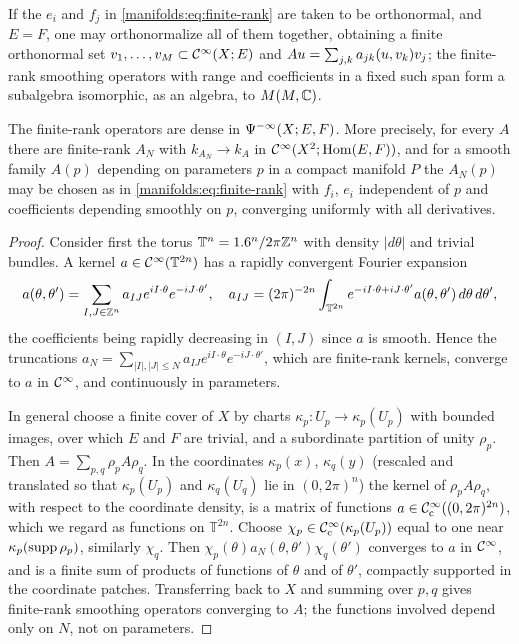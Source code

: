If the $e_i$ and $f_j$ in \eqref{manifolds:eq:finite-rank} are taken to be orthonormal,
and $E=F$, one may orthonormalize all of them together, obtaining a finite
orthonormal set $v_1,\dots,v_M\subset\mathcal{C}^\infty(X;E)$ and
$Au=\sum_{j,k}a_{jk}( u, v_k)v_j$; the finite-rank smoothing operators with range
and coefficients in a fixed such span form a subalgebra isomorphic, as an algebra,
to $M(M,\mathbb{C})$.

\begin{lemma}\label{manifolds:lem:density}
The finite-rank operators are dense in $\Psi^{-\infty}(X;E,F)$. More precisely,
for every $A$ there are finite-rank $A_N$ with $k_{A_N}\to k_A$ in $\mathcal{C}^\infty(X^2;\operatorname{Hom}(E,F))$,
and for a smooth family $A(p)$ depending on parameters $p$ in a compact manifold $P$
the $A_N(p)$ may be chosen as in \eqref{manifolds:eq:finite-rank} with $f_i$, $e_i$
independent of $p$ and coefficients depending smoothly on $p$, converging
uniformly with all derivatives.
\end{lemma}
\begin{proof}
Consider first the torus $\mathbb T^n=1.6^n/2\pi\mathbb{Z}^n$ with density $|d\theta|$ and trivial
bundles. A kernel $a\in\mathcal{C}^\infty(\mathbb T^{2n})$ has a rapidly convergent Fourier expansion
\begin{equation*}
a(\theta,\theta')=\sum_{I,J\in\mathbb{Z}^n}a_{IJ}e^{iI\cdot\theta}e^{-iJ\cdot\theta'},\quad
a_{IJ}=(2\pi)^{-2n}\int_{\mathbb T^{2n}}e^{-iI\cdot\theta+iJ\cdot\theta'}a(\theta,\theta')\,d\theta\,d\theta',
\end{equation*}
the coefficients being rapidly decreasing in $(I,J)$ since $a$ is smooth. Hence the
truncations $a_N=\sum_{|I|,|J|\le N}a_{IJ}e^{iI\cdot\theta}e^{-iJ\cdot\theta'}$, which are
finite-rank kernels, converge to $a$ in $\mathcal{C}^\infty$, and continuously in parameters.

In general choose a finite cover of $X$ by charts $\kappa_p:U_p\to\kappa_p(U_p)$ with
bounded images, over which $E$ and $F$ are trivial, and a subordinate partition of unity
$\rho_p$. Then $A=\sum_{p,q}\rho_pA\rho_q$. In the coordinates $\kappa_p(x)$, $\kappa_q(y)$
(rescaled and translated so that $\kappa_p(U_p)$ and $\kappa_q(U_q)$ lie in $(0,2\pi)^n$) the
kernel of $\rho_pA\rho_q$, with respect to the coordinate density, is a matrix of
functions $a\in\mathcal{C}^\infty_{\mathrm{c}}((0,2\pi)^{2n})$, which we regard as functions on $\mathbb T^{2n}$. Choose
$\chi_p\in\mathcal{C}^\infty_{\mathrm{c}}(\kappa_p(U_p))$ equal to one near $\kappa_p(\operatorname{supp}\rho_p)$, similarly $\chi_q$.
Then $\chi_p(\theta)a_N(\theta,\theta')\chi_q(\theta')$ converges to $a$ in $\mathcal{C}^\infty$, and is a finite
sum of products of functions of $\theta$ and of $\theta'$, compactly supported in the
coordinate patches. Transferring back to $X$ and summing over $p,q$ gives finite-rank
smoothing operators converging to $A$; the functions involved depend only on $N$,
not on parameters.
\end{proof}

